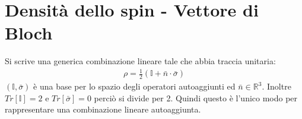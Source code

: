 


%
\section{Densità dello spin - Vettore di Bloch} %
Si scrive una generica combinazione lineare tale che abbia traccia unitaria:
\begin{equation}\begin{split}
\rho=\frac{1}{2}\left(\mathbb{I}+\bar n\cdot \bar \sigma\right)
\end{split}\end{equation}
$\left(\mathbb{I},\bar \sigma\right)$ è una base per lo spazio degli operatori autoaggiunti ed $\bar n\in \mathbb{R} ^3$. Inoltre $Tr \left[\mathbb{I}\right] = 2$ e $Tr \left[\mathbb{ \bar \sigma} \right] = 0$ perciò si divide per 2. Quindi questo è l'unico modo per rappresentare una combinazione lineare autoaggiunta.\\

